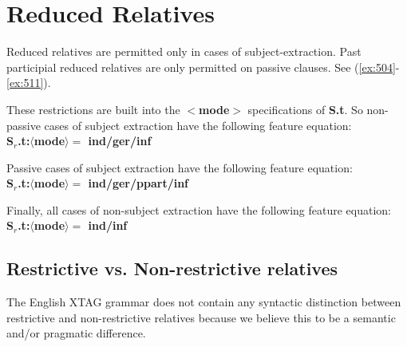 \section{Reduced Relatives} 
Reduced relatives are permitted only in cases of subject-extraction. 
Past participial reduced relatives are only permitted on passive 
clauses. 
See (\ref{ex:504}-\ref{ex:511}). 
 
\beginsentences
{}\label{ex:504} 
\label{ex:505} 
\label{ex:506} 
\label{ex:507} 
\label{ex:508} 
\label{ex:509} 
\label{ex:510} 
\label{ex:511} 
\endsentences

 
These restrictions are built into the {\bf $<$mode$>$} specifications 
of {\bf S.t}. So non-passive cases of subject extraction have the following 
feature equation:\\ 
{\bf S$_{r}$.t:$\langle$mode$\rangle =$ ind/ger/inf} 
 
Passive cases of subject extraction have the following 
feature equation:\\ 
{\bf S$_{r}$.t:$\langle$mode$\rangle =$ ind/ger/ppart/inf} 
 
Finally, all cases of non-subject extraction have the following 
feature equation:\\ 
{\bf S$_{r}$.t:$\langle$mode$\rangle =$ ind/inf}\\ 
 
\subsection{Restrictive vs. Non-restrictive relatives} 
 
The English XTAG grammar does not contain any  syntactic distinction between 
restrictive and non-restrictive relatives because we believe this to 
be a semantic and/or pragmatic difference. 
 
